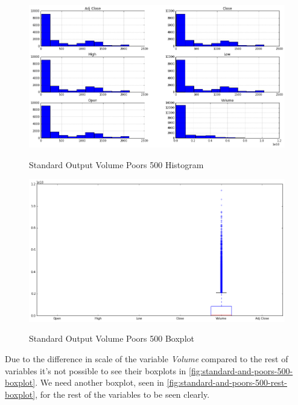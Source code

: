 \begin{figure}[bth]
  \myfloatalign
  {\includegraphics[width=1\linewidth]
    {gfx/standard-and-poors-500-histogram}}
  \caption{Standard Output Volume Poors 500
    Histogram}
  \label{fig:standard-and-poors-500-histogram}
\end{figure}

\begin{figure}[bth]
  \myfloatalign
  {\includegraphics[width=1\linewidth]
    {gfx/standard-and-poors-500-boxplot}}
  \caption{Standard Output Volume Poors 500
    Boxplot}
  \label{fig:standard-and-poors-500-boxplot}
\end{figure}

Due to the difference in scale of the variable \textit{Volume}
compared to the rest of variables it's not possible to see their
boxplots in \autoref{fig:standard-and-poors-500-boxplot}. We need
another boxplot, seen in
\autoref{fig:standard-and-poors-500-rest-boxplot}, for the rest of the
variables to be seen clearly.

